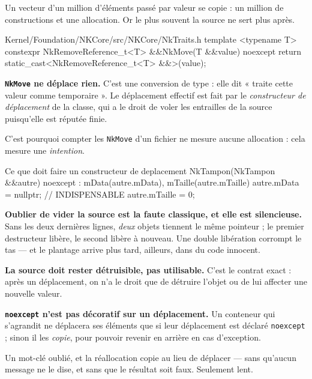 Un vecteur d'un million d'éléments passé par valeur se copie : un million de
constructions et une allocation. Or le plus souvent la source ne sert plus après.

\begin{nkcode}{Kernel/Foundation/NKCore/src/NKCore/NkTraits.h}
template <typename T> constexpr NkRemoveReference_t<T> &&NkMove(T &&value) noexcept {
    return static_cast<NkRemoveReference_t<T> &&>(value);
}
\end{nkcode}

\begin{nkretenir}
\textbf{\texttt{NkMove} ne déplace rien.} C'est une conversion de type : elle dit
« traite cette valeur comme temporaire ». Le déplacement effectif est fait par le
\emph{constructeur de déplacement} de la classe, qui a le droit de voler les
entrailles de la source puisqu'elle est réputée finie.

C'est pourquoi compter les \texttt{NkMove} d'un fichier ne mesure aucune
allocation : cela mesure une \emph{intention}.
\end{nkretenir}

\begin{nkcode}{Ce que doit faire un constructeur de deplacement}
NkTampon(NkTampon &&autre) noexcept
    : mData(autre.mData), mTaille(autre.mTaille) {
    autre.mData = nullptr;      // INDISPENSABLE
    autre.mTaille = 0;
}
\end{nkcode}

\begin{nkpiege}
\textbf{Oublier de vider la source est la faute classique, et elle est
silencieuse.} Sans les deux dernières lignes, \emph{deux} objets tiennent le
même pointeur ; le premier destructeur libère, le second libère à nouveau. Une
double libération corrompt le tas --- et le plantage arrive plus tard, ailleurs,
dans du code innocent.

\textbf{La source doit rester détruisible, pas utilisable.} C'est le contrat
exact : après un déplacement, on n'a le droit que de détruire l'objet ou de lui
affecter une nouvelle valeur.
\end{nkpiege}

\begin{nkretenir}
\textbf{\texttt{noexcept} n'est pas décoratif sur un déplacement.} Un conteneur
qui s'agrandit ne déplacera ses éléments que si leur déplacement est déclaré
\texttt{noexcept} ; sinon il les \emph{copie}, pour pouvoir revenir en arrière en
cas d'exception.

Un mot-clé oublié, et la réallocation copie au lieu de déplacer --- sans qu'aucun
message ne le dise, et sans que le résultat soit faux. Seulement lent.
\end{nkretenir}

